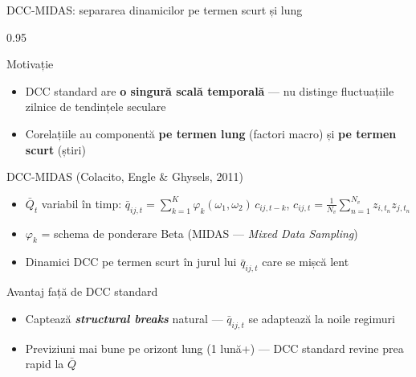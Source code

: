 \documentclass[9pt, aspectratio=169, t]{beamer}
\begin{document}
\begin{frame}{DCC-MIDAS: separarea dinamicilor pe termen scurt și lung}
    \begin{cminipage}{0.95\textwidth}
    \vspace{-3mm}
    {\scriptsize
    \begin{block}{Motivație}
        \begin{itemize}\setlength{\itemsep}{0pt}
            \item DCC standard are \textbf{o singură scală temporală} --- nu distinge fluctuațiile zilnice de tendințele seculare
            \item Corelațiile au componentă \textbf{pe termen lung} (factori macro) și \textbf{pe termen scurt} (știri)
        \end{itemize}
    \end{block}
    \vspace{-2mm}
    \begin{block}{DCC-MIDAS (Colacito, Engle \& Ghysels, 2011)}
        \begin{itemize}\setlength{\itemsep}{0pt}
            \item $\bar{Q}_t$ variabil în timp: $\bar{q}_{ij,t} = \sum_{k=1}^{K} \varphi_k(\omega_1, \omega_2)\, c_{ij,t-k}$, \; $c_{ij,t} = \frac{1}{N_v}\sum_{n=1}^{N_v} z_{i,t_n}z_{j,t_n}$
            \item $\varphi_k$ = schema de ponderare Beta (MIDAS --- \textit{Mixed Data Sampling})
            \item Dinamici DCC pe termen scurt în jurul lui $\bar{q}_{ij,t}$ care se mișcă lent
        \end{itemize}
    \end{block}
    \vspace{-2mm}
    \begin{alertblock}{Avantaj față de DCC standard}
        \begin{itemize}\setlength{\itemsep}{0pt}
            \item Captează \textbf{\textit{structural breaks}} natural --- $\bar{q}_{ij,t}$ se adaptează la noile regimuri
            \item Previziuni mai bune pe orizont lung (1 lună+) --- DCC standard revine prea rapid la $\bar{Q}$
        \end{itemize}
    \end{alertblock}
    }
    \end{cminipage}
\end{frame}
\end{document}
